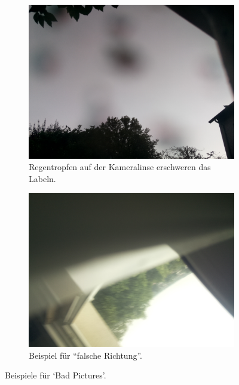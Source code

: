 \begin{figure}
  \begin{subfigure}[t]{0.48\textwidth}
    \centering
    \includegraphics[width=\textwidth]{pictures/bad_rain.pdf}
    \caption{Regentropfen auf der Kameralinse erschweren das Labeln.}%
    \label{fig:rain}
  \end{subfigure}
  \begin{subfigure}[t]{0.48\textwidth}
    \centering
    \includegraphics[width=\textwidth]{pictures/bad_2.pdf}
    \caption{Beispiel für \enquote{falsche Richtung}.}%
    \label{fig:wrong_direction}
  \end{subfigure}
  \caption{Beispiele für `Bad Pictures'.}%
  \label{fig:fehler}
\end{figure}

